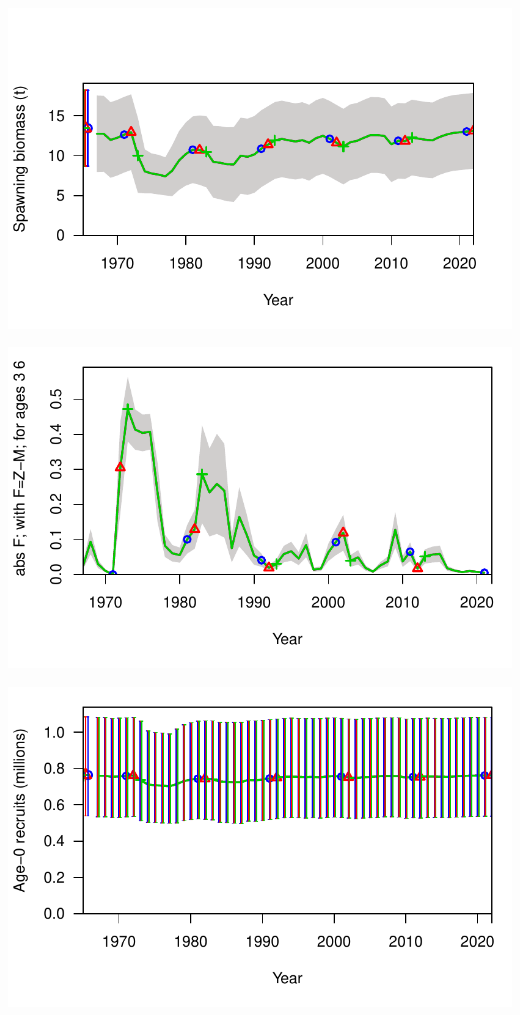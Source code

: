 \documentclass[
  letterpaper,
  DIV=11,
  numbers=noendperiod]{scrartcl}
\begin{document}
\includegraphics{LUKA_50_Base_model_diags_report_files/figure-pdf/model-comparisons-1.pdf}

\includegraphics{LUKA_50_Base_model_diags_report_files/figure-pdf/model-comparisons-2.pdf}

\includegraphics{LUKA_50_Base_model_diags_report_files/figure-pdf/model-comparisons-3.pdf}
\end{document}
